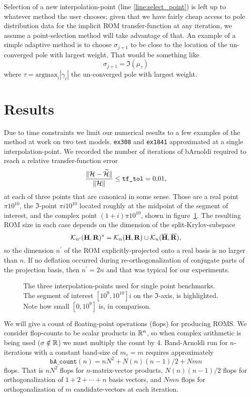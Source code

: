 Selection of a new interpolation-point (line \ref{line:select_point}) is left up to whatever method the user chooses; given that we have fairly cheap access to pole distribution data for the implicit ROM transfer-function at any iteration, we assume a point-selection method will take advantage of that.  An example of a  simple adaptive method is to choose $\sigma_{j+1}$ to be close to the location of the un-converged pole with largest weight.  That would be something like   
\[
\sigma_{j+1}=\Im(\mu_\tau)
\]
 where $\tau=\text{argmax}_i|\gamma_i|$ the un-converged pole with largest weight.
\clearpage

\section{Results}
Due to time constraints we limit our numerical results to a few examples of the method at work on two test models.  \texttt{ex308} and \texttt{ex1841} approximated at a single interpolation-point.  
We recorded the number of iterations of bArnoldi required to reach a relative transfer-function error 
\begin{equation}
\frac{\|\mathcal{H}-\widetilde{\mathcal{H}}\|}{\| \mathcal{H} \|}\leq \texttt{tf\_tol} =  0.01,
\label{eq:tfunc_rel_err}
\end{equation}
 at each of three points that are canonical in some sense.    Those are a real point $\pi 10^{10}$,  the $\Im$-point $\pi i 10^{10}$ located roughly at the midpoint of the segment of interest, and the complex point $(1+i)\pi 10^{10}$, shown in figure~\ref{fig:3points}.
  The resulting ROM size in each case depends on the dimension of the split-Krylov-subspace 
\[
\mathcal{K}_{n^\prime}({\textbf{\textup{H}}},{\textbf{\textup{R}}})^* 
= \mathcal{K}_{n}({\textbf{\textup{H}}},{\textbf{\textup{R}}}) \cup \mathcal{K}_{n}({\overline{\textbf{\textup{H}}}},{\overline{\textbf{\textup{R}}}}),
\]
so the dimension $n^\prime$ of the ROM explicitly-projected onto a real basis is no larger than $n$.  If no deflation occurred during re-orthogonalization of conjugate parts of the projection basis, then $n^\prime = 2n$ and that was typical for our experiments. 

\begin{figure}
\centering
{}
\caption{\label{fig:3points} The three interpolation-points used for single point benchmarks. The segment of interest $[10^9,10^{10}]i$ on the $\Im$-axis, is highlighted.  Note how small $[0,10^9]$ is, in comparison.  }
\end{figure}

We will give a count of floating-point operations (flops) for producing ROMS.  We consider flop-counts to be scalar products in $\mathbb{R}^n$, so when complex arithmetic is being used ($\sigma\notin\mathbb{R}$) we must multiply the count by 4.  Band-Arnoldi run for $n$-iterations with a constant band-size of $m_c=m$ requires approximately
\[
\texttt{bA\_count}(n) = n N^2 + N (n)(n-1)/2 + N m n 
\]
flops.   That is  $n N^2$ flops for $n$-matrix-vector products, $N (n)(n-1)/2$ flops for orthogonalization of $1+2+\cdots+n$ basis vectors, and $N m n$ flops for orthogonalization of $m$ candidate-vectors at each iteration.   

